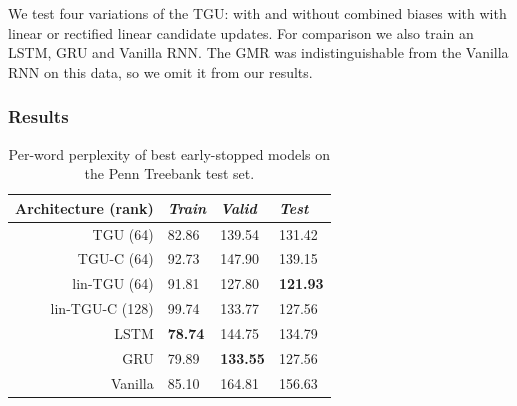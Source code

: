 We test four variations of the TGU: with and without
combined biases with with linear or rectified linear candidate updates. For comparison we also train
an LSTM, GRU and Vanilla RNN. The GMR was indistinguishable from the Vanilla RNN
on this data, so we omit it from our
results.

\subsubsection{Results}

\begin{table}
\centering
\begin{tabu} to \textwidth {r||l|l|l}
 Architecture (rank) & \emph{Train} & \emph{Valid} & \emph{Test} \\
\hline
TGU   (64)    & 82.86 & 139.54 & 131.42 \\
TGU-C  (64)   & 92.73 & 147.90 & 139.15 \\
lin-TGU (64)  & 91.81 & 127.80 & \textbf{121.93} \\
lin-TGU-C (128) & 99.74 & 133.77 & 127.56 \\
\hline
LSTM      & \textbf{78.74} & 144.75 & 134.79 \\
GRU       & 79.89 & \textbf{133.55} & 127.56 \\
Vanilla   & 85.10 & 164.81 & 156.63 \\
\hline
\end{tabu}

\caption[PTB test set results]{Per-word perplexity of best early-stopped models on the Penn Treebank test set.}
\label{tab:ptb}
\end{table}


